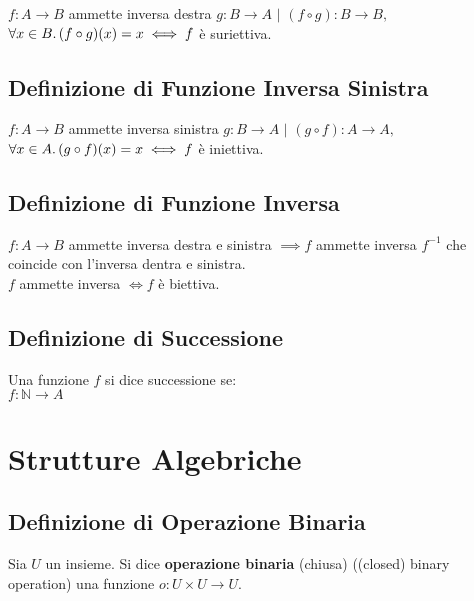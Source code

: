 \documentclass[a4paper, twoside, italian, 11pt]{book}
\newcommand{\N}{\mathbb{N}}
\begin{document}
$f : A \rightarrow B$ ammette inversa destra $g : B \rightarrow A$ $|$ $(f \circ g) : B \rightarrow B,$ $\forall x \in B \ldotp (f \circ g)(x) = x \iff f$ è suriettiva.



\section{Definizione di Funzione Inversa Sinistra}

$f : A \rightarrow B$ ammette inversa sinistra $g : B \rightarrow A$ $|$ $(g \circ f) : A \rightarrow A,$ $\forall x \in A \ldotp (g \circ f)(x) = x \iff f$ è iniettiva.



\section{Definizione di Funzione Inversa}

$f : A \rightarrow B$ ammette inversa destra e sinistra $\implies f$ ammette inversa $f^{-1}$ che coincide con l'inversa dentra e sinistra. \\

\noindent
$f$ ammette inversa $\iff f$ è biettiva.





\section{Definizione di Successione}

Una funzione $f$ si dice successione se: \\

$f : \N \rightarrow A$



\chapter{Strutture Algebriche}


\section{Definizione di Operazione Binaria}

Sia $U$ un insieme. Si dice \textbf{operazione binaria} (chiusa) ((closed) binary operation) una funzione $o : U \times U \rightarrow U$.
\end{document}
